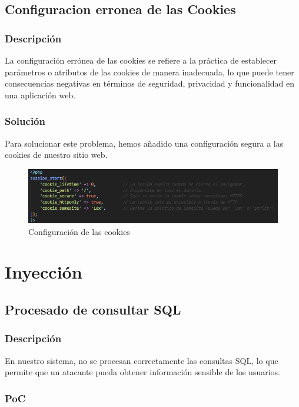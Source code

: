 \documentclass{report}
\begin{document}
            \subsection{Configuracion erronea de las Cookies}
                \subsubsection{Descripción}
                    La configuración errónea de las cookies se refiere a la práctica de establecer parámetros o atributos de las cookies de manera inadecuada, lo que puede tener consecuencias negativas en términos de seguridad, privacidad y funcionalidad en una aplicación web.                
                \subsubsection{Solución}
                    Para solucionar este problema, hemos añadido una configuración segura a las cookies de nuestro sitio web.
                    \begin{figure}[H]
                        \centering
                        \includegraphics[width=\textwidth]{./img/vulnerabilidades/3.2.4.1.png}
                        \caption{Configuración de las cookies}
                    \end{figure}
            \clearpage
        \section{Inyección}
            \subsection{Procesado de consultar SQL}
                \subsubsection{Descripción}
                    En nuestro sistema, no se procesan correctamente las consultas SQL, lo que permite que un atacante pueda obtener información sensible de los usuarios.
                \subsubsection{PoC}
\end{document}
